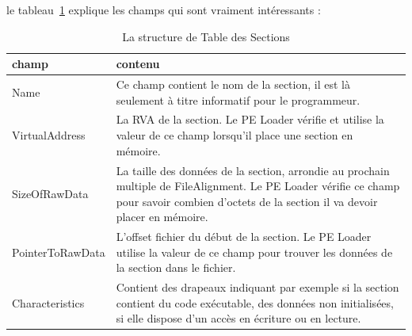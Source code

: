 le tableau~\ref{tab3} explique les champs qui sont vraiment intéressants : 
\begin{table}[H]
\begin{tabular}{|p{4.5cm}|p{10.5cm}|}
\hline \textbf{champ} &  \textbf{contenu}\\
\hline Name & Ce champ contient le nom de la section, il est là seulement à titre informatif pour le programmeur.\\
\hline VirtualAddress &	La RVA de la section. Le PE Loader vérifie et utilise la valeur de ce champ lorsqu'il place une section en mémoire.\\
\hline SizeOfRawData & La taille des données de la section, arrondie au prochain multiple de FileAlignment. Le PE Loader vérifie ce champ pour savoir combien d'octets de la section il va devoir placer en mémoire.\\
\hline PointerToRawData & L'offset fichier du début de la section. Le PE Loader utilise la valeur de ce champ pour trouver les données de la section dans le fichier.\\
\hline Characteristics & Contient des drapeaux indiquant par exemple si la section contient du code exécutable, des données non initialisées, si elle dispose d'un accès en écriture ou en lecture.\\
\hline
\end{tabular}
\caption{La structure de Table des Sections}
\label{tab3}
\end{table}


